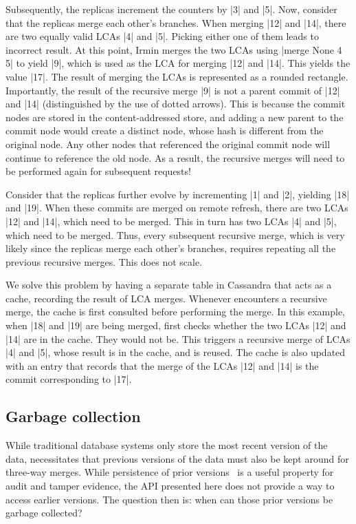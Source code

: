 Subsequently, the replicas increment the counters by |3| and |5|. Now, consider
that the replicas merge each other's branches. When merging |12| and |14|,
there are two equally valid LCAs |4| and |5|. Picking either one of them leads
to incorrect result. At this point, Irmin merges the two LCAs             using
|merge None 4 5| to yield |9|, which is used as the LCA for merging |12| and
|14|. This yields the value |17|. The result of merging the LCAs is represented
as a rounded rectangle. Importantly, the result of the recursive merge |9| is
not a parent commit of |12| and |14| (distinguished by the use of dotted
arrows). This is because the commit nodes are stored in the content-addressed
store, and adding a new parent to the commit node would create a distinct node,
whose hash is different from the original node. Any other nodes that referenced
the original commit node will continue to reference the old node. As a result,
the recursive merges will need to be performed again for subsequent requests!

Consider that the replicas further evolve by incrementing |1| and |2|, yielding
|18| and |19|. When these commits are merged on remote refresh, there are two
LCAs |12| and |14|, which need to be merged. This in turn has two LCAs |4| and
|5|, which need to be merged. Thus, every subsequent recursive merge, which is
very likely since the replicas merge each other's branches, requires repeating
all the previous recursive merges. This does not scale.

We solve this problem by having a separate table in Cassandra that acts as a
cache, recording the result of LCA merges. Whenever \name encounters a
recursive merge, the cache is first consulted before performing the merge. In
this example, when |18| and |19| are being merged, \name first checks whether
the two LCAs |12| and |14| are in the cache. They would not be. This triggers a
recursive merge of LCAs |4| and |5|, whose result is in the cache, and is
reused. The cache is also updated with an entry that records that the merge of
the LCAs |12| and |14| is the commit corresponding to |17|.

\subsection{Garbage collection}
\label{sec:gc}

While traditional database systems only store the most recent version of the
data, \name necessitates that previous versions of the data must also be kept
around for three-way merges. While persistence of prior
versions~\cite{Driscoll86,farinier15} is a useful property for audit and tamper
evidence, the \name API presented here does not provide a way to access earlier
versions. The question then is: when can those prior versions be garbage
collected?

